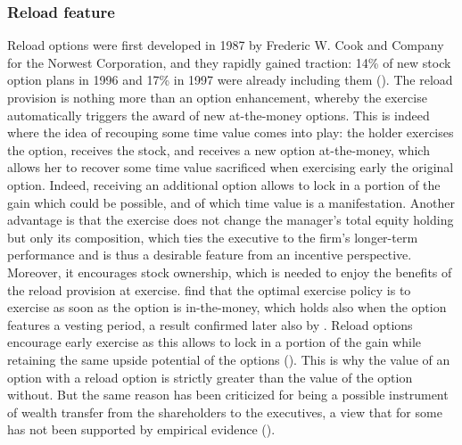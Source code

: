 \subsubsection{Reload feature}
    Reload options were first developed in 1987 by Frederic W. Cook and Company for the Norwest Corporation, and they rapidly gained traction: 14\% of new stock option plans in 1996 and 17\% in 1997 were already including them (\cite{dybvig2003employee}).
    The reload provision is nothing more than an option enhancement, whereby the exercise automatically triggers the award of new at-the-money options. This is indeed where the idea of recouping some time value comes into play: the holder exercises the option, receives the stock, and receives a new option at-the-money, which allows her to recover some time value sacrificed when exercising early the original option. Indeed, receiving an additional option allows to lock in a portion of the gain which could be possible, and of which time value is a manifestation. Another advantage is that the exercise does not change the manager's total equity holding but only its composition, which ties the executive to the firm's longer-term performance and is thus a desirable feature from an incentive perspective. Moreover, it encourages stock ownership, which is needed to enjoy the benefits of the reload provision at exercise. 
    \cite{hemmer2000reload} find that the optimal exercise policy is to exercise as soon as the option is in-the-money, which holds also when the option features a vesting period, a result confirmed later also by \cite{dybvig2003employee}. Reload options encourage early exercise as this allows to lock in a portion of the gain while retaining the same upside potential of the options (\cite{hemmer1998optimal}). This is why the value of an option with a reload option is strictly greater than the value of the option without. But the same reason has been criticized for being a possible instrument of wealth transfer from the shareholders to the executives, a view that for some has not been supported by empirical evidence (\cite{dybvig2003employee}).
